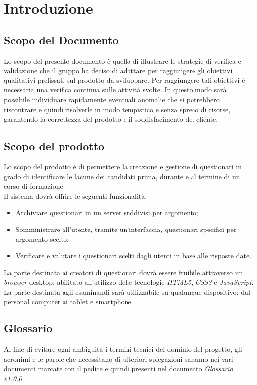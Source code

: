 \newpage
\section{Introduzione}
\subsection{Scopo del Documento}
Lo scopo del presente documento è quello di illustrare le strategie di verifica e validazione che il gruppo \gruppo \hspace{1mm} ha deciso di adottare per raggiungere gli obiettivi qualitativi prefissati sul prodotto da sviluppare. Per raggiungere tali obiettivi è necessaria una verifica continua sulle attività svolte. In questo modo sarà possibile individuare rapidamente eventuali anomalie che si potrebbero riscontrare e quindi risolverle in modo tempistico e senza spreco di risorse, garantendo la correttezza del prodotto e il soddisfacimento del cliente.

\subsection{Scopo del prodotto}
Lo scopo del prodotto è di permettere la creazione e gestione di questionari in grado di identificare le lacune dei candidati prima, durante e al termine di un corso di formazione. 
\\Il sistema dovrà offrire le seguenti funzionalità:
\begin{itemize}
	\item
	Archiviare questionari in un server suddivisi per argomento;
	\item
	Somministrare all'utente, tramite un'interfaccia, questionari specifici per argomento scelto;
	\item
	Verificare e valutare i questionari scelti dagli utenti in base alle risposte date.
\end{itemize}
La parte destinata ai creatori di questionari dovrà essere fruibile attraverso un \textit{browser} desktop, abilitato all'utilizzo delle tecnologie \textit{HTML5}, \textit{CSS3} e \textit{JavaScript}. La parte destinata agli esaminandi sarà utilizzabile su qualunque dispositivo: dal personal computer ai tablet e smartphone.

\subsection{Glossario}
Al fine di evitare ogni ambiguità i termini tecnici del dominio del progetto, gli acronimi e le parole che necessitano di ulteriori spiegazioni saranno nei vari documenti marcate con il pedice  e quindi presenti nel documento \textit{Glossario v1.0.0}.
